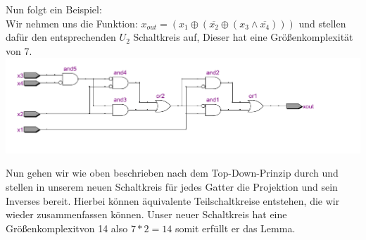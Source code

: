 \documentclass[a4paper]{article}
\begin{document}

Nun folgt ein Beispiel: \\

Wir nehmen uns die Funktion: $x_{out} = (x_1 \oplus (\overline{x_2} \oplus (x_3 \wedge \overline{x_4})))$ und
stellen daf\"ur den entsprechenden $U_2$ Schaltkreis auf, Dieser hat eine Gr\"o\ss{}enkomplexit\"at von 7.\\

\includegraphics[scale=0.50]{images/ursk.pdf}

Nun gehen wir wie oben beschrieben nach dem Top-Down-Prinzip durch und stellen in unserem neuen Schaltkreis f\"ur jedes Gatter
die Projektion und sein Inverses bereit. Hierbei k\"onnen \"aquivalente Teilschaltkreise entstehen, die wir wieder zusammenfassen k\"onnen.
Unser neuer Schaltkreis hat eine Gr\"o\ss{}enkomplexitvon 14 also $7 * 2 = 14$ somit erf\"ullt er das Lemma. \\


\end{document}
